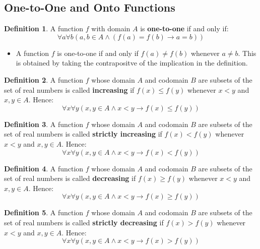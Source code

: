 \documentclass[article, 12pt]{article}
\theoremstyle{definition}
\newtheorem{definition}{Definition}[subsection]
\begin{document}
    \subsection{One-to-One and Onto Functions}
    \begin{definition}
        A function $f$ with domain $A$ is \textbf{one-to-one} if and only if: 
        \begin{equation*}
            \forall a \forall b (a,b \in A \land (f(a) = f(b) \to a = b))
        \end{equation*}
        \begin{itemize}
            \item A function $f$ is one-to-one if and only if $f(a) \neq f(b)$ whenever $a \neq b$. This is obtained by taking the contrapositve of the implication in the definition.
        \end{itemize}
    \end{definition}
    \begin{definition}
        A function $f$ whose domain $A$ and codomain $B$ are subsets of the set of real numbers is called \textbf{increasing} if $f(x) \leq f(y)$ whenever $x < y$ and $x,y \in A$. Hence:
        \begin{equation*}
            \forall x \forall y (x,y \in A \land x < y \to f(x) \leq f(y))
        \end{equation*}
    \end{definition}
    \begin{definition}
        A function $f$ whose domain $A$ and codomain $B$ are subsets of the set of real numbers is called \textbf{strictly increasing} if $f(x) < f(y)$ whenever $x < y$ and $x,y \in A$. Hence:
        \begin{equation*}
            \forall x \forall y (x,y \in A \land x < y \to f(x) < f(y))
        \end{equation*}
    \end{definition}
    \begin{definition}
        A function $f$ whose domain $A$ and codomain $B$ are subsets of the set of real numbers is called \textbf{decreasing} if $f(x) \geq f(y)$ whenever $x < y$ and $x,y \in A$. Hence:
        \begin{equation*}
            \forall x \forall y (x,y \in A \land x < y \to f(x) \geq f(y))
        \end{equation*}
    \end{definition}
    \begin{definition}
        A function $f$ whose domain $A$ and codomain $B$ are subsets of the set of real numbers is called \textbf{strictly decreasing} if $f(x) > f(y)$ whenever $x < y$ and $x,y \in A$. Hence:
        \begin{equation*}
            \forall x \forall y (x,y \in A \land x < y \to f(x) > f(y))
        \end{equation*}
    \end{definition}
\end{document}
